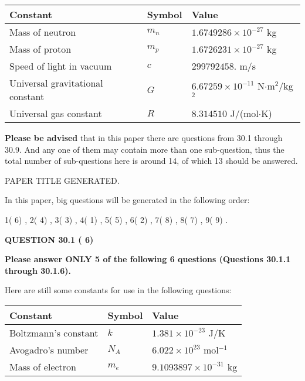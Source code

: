 \documentclass[12pt]{article}
\begin{document}
 
\noindent\begin{tabular}{|l|l|l|}
\hline
Constant & Symbol & Value \\
\hline
Mass of neutron &
$m_n$ &
 $ 1.6749286 \times 10^{-27} $
kg \\
\hline
Mass of proton &
$m_p$ &
 $ 1.6726231 \times 10^{-27} $
kg \\
\hline
Speed of light in vacuum &
$c$ &
 $ 299792458. $
m/s \\
\hline
Universal gravitational constant &
$G$ &
 $ 6.67259 \times 10^{-11} $
N$\cdot $m$^2$/kg$^2$ \\
\hline
Universal gas constant &
$R$ &
 $ 8.314510 $
J/(mol$\cdot $K) \\
\hline
\end{tabular}
 
 
{\textbf{\large{Please be advised}}} that in this paper there are questions from
30.1 through
30.9.
And any one of them may contain more than one sub-question, thus the total number
of sub-questions here is around 14, of which
13 should be answered.
 
\vspace{0.3in}
 
 
   
   
 PAPER TITLE GENERATED.
   
   
   
\vspace{0.2in}
   
In this paper, big questions will be generated in the following order: 
   
   
            1(          6)
 ,
            2(          4)
 ,
            3(          3)
 ,
            4(          1)
 ,
            5(          5)
 ,
            6(          2)
 ,
            7(          8)
 ,
            8(          7)
 ,
            9(          9)
 .
  
\vspace{0.2in}
  
{\textbf{\Large{QUESTION
30.1 
 (          6)
}}}
  
  
 
{\textbf{\Large{Please answer ONLY
5 of the following
6 questions (Questions
30.1.1 through
30.1.6). }}}
 
Here are still some constants for use in the following questions:
 
 
\noindent\begin{tabular}{|l|l|l|}
\hline
Constant & Symbol & Value \\
\hline
 
Boltzmann's constant &
$k$ &
 $ 1.381 \times 10^{-23} $
J/K \\
\hline
 
Avogadro's number &
$N_A$ &
 $ 6.022 \times 10^{23} $
mol$^{-1}$ \\
\hline
 
Mass of electron &
$m_e$ &
 $ 9.1093897 \times 10^{-31} $
kg \\
\hline
 
\end{tabular}
 
\end{document}

